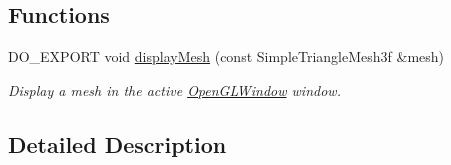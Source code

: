 \subsection*{Functions}
\begin{DoxyCompactItemize}
\item 
\hypertarget{group___draw3_d_ga07235b9568ca2bcaaa75fcd401e6ded3}{D\-O\-\_\-\-E\-X\-P\-O\-R\-T void \hyperlink{group___draw3_d_ga07235b9568ca2bcaaa75fcd401e6ded3}{display\-Mesh} (const Simple\-Triangle\-Mesh3f \&mesh)}\label{group___draw3_d_ga07235b9568ca2bcaaa75fcd401e6ded3}

\begin{DoxyCompactList}\small\item\em Display a mesh in the active \hyperlink{class_d_o_1_1_open_g_l_window}{Open\-G\-L\-Window} window. \end{DoxyCompactList}\end{DoxyCompactItemize}


\subsection{Detailed Description}
